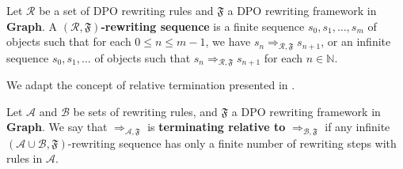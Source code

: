 \begin{definition}
    Let \(\mathcal{R}\) be a set of DPO rewriting rules and $\mathfrak{F}$ a DPO rewriting framework in \textbf{Graph}.
    A \textbf{$(\mathcal{R},\mathfrak{F})$-rewriting sequence} is a finite sequence \(s_0,s_1,\hdots, s_m\) of objects such that for each \( 0 \leq n \leq m-1\), we have \(s_n \mathop{\Rightarrow}_{\mathcal{R},\mathfrak{F}} s_{n+1}\), or an infinite sequence \(s_0,s_1,\hdots\) of objects such that \(s_n \mathop{\Rightarrow}_{\mathcal{R},\mathfrak{F}} s_{n+1}\) for each \(n \mathop{\in} \mathbb{N}\).
\end{definition}
We adapt the concept of relative termination presented in \cite{klop1987term,geser1990relative}.
\begin{definition}
    \label{termination:def:relative_termination}
     Let $\mathcal{A}$ and $\mathcal{B}$ be sets of rewriting rules, and $\mathfrak{F}$ a DPO rewriting framework in \textbf{Graph}. We say that $\mathop{\Rightarrow}_{\mathcal{A},\mathfrak{F}}$ is \textbf{terminating relative to} $\mathop{\Rightarrow}_{\mathcal{B}, \mathfrak{F}}$ if any infinite $(\mathcal{A} \mathop{\cup} \mathcal{B},\mathfrak{F})$-rewriting sequence has only a finite number of rewriting steps with rules in $\mathcal{A}$.
\end{definition}